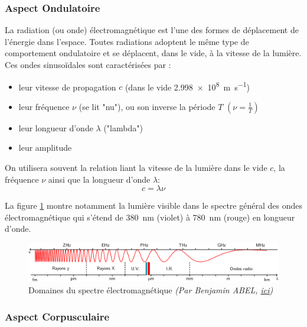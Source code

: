 \documentclass{article}
\begin{document}
\subsubsection{Aspect Ondulatoire}

La radiation (ou onde) électromagnétique est l'une des formes de déplacement de l'énergie dans l'espace. Toutes radiations adoptent le même type de 
comportement ondulatoire et se déplacent, dans le vide, à la vitesse de la lumière. Ces ondes sinusoïdales sont caractérisées par :
\begin{itemize}[label=$\ast$]
    \item leur vitesse de propagation $c$ (dans le vide \qty{2.998e8}{m.s^{-1}})
    \item leur fréquence $\nu$ (se lit "nu"), ou son inverse la période $T$ $\left(\nu=\frac{1}{T}\right)$
    \item leur longueur d'onde $\lambda$ ("lambda")
    \item leur amplitude
\end{itemize}

\vspace{3mm}
On utilisera souvent la relation liant la vitesse de la lumière dans le vide $c$, la fréquence  $\nu$ ainsi que la longueur d'onde $\lambda$: $$\boxed{c=\lambda \nu}$$

\vspace{5mm}

La figure \ref{fig:domaine spectre electromagnetique} montre notamment la lumière visible dans le spectre général des ondes électromagnétique qui s'étend de \qty{380}{nm} (violet) à \qty{780}{nm} (rouge) en longueur d'onde.

\begin{figure}[ht]
    \centering
    \includegraphics[width=1\linewidth]{Fig/Domaines_du_spectre_électromagnétique.png}
    \caption{Domaines du spectre électromagnétique \textit{(Par Benjamin ABEL, \href{https://commons.wikimedia.org/w/index.php?curid=22016632}{ici})}}
    \label{fig:domaine spectre electromagnetique}
\end{figure}


\subsubsection{Aspect Corpusculaire}
\end{document}
